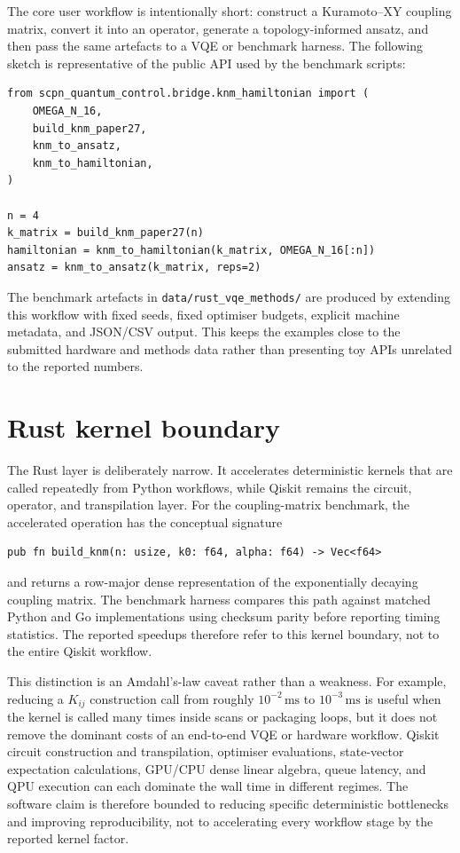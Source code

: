 \documentclass[preprint,aps,physrev,superscriptaddress,floatfix,longbibliography]{revtex4-2}
\begin{document}
The core user workflow is intentionally short: construct a Kuramoto--XY
coupling matrix, convert it into an operator, generate a topology-informed
ansatz, and then pass the same artefacts to a VQE or benchmark harness.
The following sketch is representative of the public API used by the
benchmark scripts:

\begin{verbatim}
from scpn_quantum_control.bridge.knm_hamiltonian import (
    OMEGA_N_16,
    build_knm_paper27,
    knm_to_ansatz,
    knm_to_hamiltonian,
)

n = 4
k_matrix = build_knm_paper27(n)
hamiltonian = knm_to_hamiltonian(k_matrix, OMEGA_N_16[:n])
ansatz = knm_to_ansatz(k_matrix, reps=2)
\end{verbatim}

The benchmark artefacts in \texttt{data/rust\_vqe\_methods/} are produced
by extending this workflow with fixed seeds, fixed optimiser budgets,
explicit machine metadata, and JSON/CSV output. This keeps the examples
close to the submitted hardware and methods data rather than presenting
toy APIs unrelated to the reported numbers.

\section{Rust kernel boundary}

The Rust layer is deliberately narrow. It accelerates deterministic kernels
that are called repeatedly from Python workflows, while Qiskit remains the
circuit, operator, and transpilation layer. For the coupling-matrix
benchmark, the accelerated operation has the conceptual signature

\begin{verbatim}
pub fn build_knm(n: usize, k0: f64, alpha: f64) -> Vec<f64>
\end{verbatim}

and returns a row-major dense representation of the exponentially decaying
coupling matrix. The benchmark harness compares this path against matched
Python and Go implementations using checksum parity before reporting timing
statistics. The reported speedups therefore refer to this kernel boundary,
not to the entire Qiskit workflow.

This distinction is an Amdahl's-law caveat rather than a weakness. For
example, reducing a $K_{ij}$ construction call from roughly
$10^{-2}\,\mathrm{ms}$ to $10^{-3}\,\mathrm{ms}$ is useful when the kernel is
called many times inside scans or packaging loops, but it does not remove the
dominant costs of an end-to-end VQE or hardware workflow. Qiskit circuit
construction and transpilation, optimiser evaluations, state-vector
expectation calculations, GPU/CPU dense linear algebra, queue latency, and QPU
execution can each dominate the wall time in different regimes. The software
claim is therefore bounded to reducing specific deterministic bottlenecks and
improving reproducibility, not to accelerating every workflow stage by the
reported kernel factor.
\end{document}
